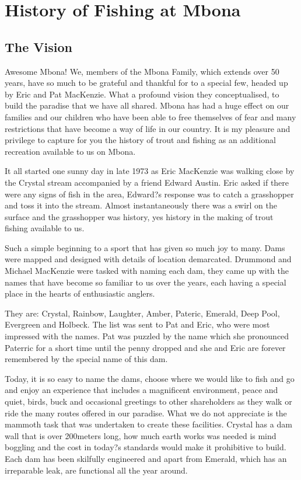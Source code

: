 
\chapter{History of Fishing at Mbona}

\section{The Vision}

Awesome Mbona! We, members of the Mbona Family, which extends over 50 years, 
have so much to be grateful and thankful for to a special few, headed up by Eric and Pat MacKenzie. 
What a profound vision they conceptualised, to build the paradise that we have all shared. 
Mbona has had a huge effect on our families and our children who have been able to free themselves 
of fear and many restrictions that have become a way of life in our country.
It is my pleasure and privilege to capture for you the history of trout and fishing as an additional recreation 
available to us on Mbona.

It all started one sunny day in late 1973 as Eric MacKenzie was walking close by the Crystal stream 
accompanied by a friend Edward Austin. Eric asked if there were any signs of fish in the area, 
Edward?s response was to catch a grasshopper and toss it into the stream. 
Almost instantaneously there was a swirl on the surface and the grasshopper was history, 
yes history in the making of trout fishing available to us. 

Such a simple beginning to a sport that has given so much joy to many.
Dams were mapped and designed with details of location demarcated. 
Drummond and Michael MacKenzie were tasked with naming each dam, 
they came up with the names that have become so familiar to us over the years, 
each having a special place in the hearts of enthusiastic anglers. 

They are:  Crystal, Rainbow, Laughter, Amber, Pateric, Emerald, Deep Pool, Evergreen and Holbeck. 
The list was sent to Pat and Eric, who were most impressed with the names. 
Pat was puzzled by the name which she pronounced Paterric for a short time until 
the penny dropped and she and Eric are forever remembered by the special name of this dam.

Today, it is so easy to name the dams, choose where we would like to fish and go 
and enjoy an experience that includes a magnificent environment, peace and quiet, birds, buck 
and occasional greetings to other shareholders as they walk or ride the many routes offered in our paradise. 
What we do not appreciate is the mammoth task that was undertaken to create these facilities. 
Crystal has a dam wall that is over 200meters long, how much earth works was needed is 
mind boggling and the cost in today?s standards would make it prohibitive to build. 
Each dam has been skilfully engineered and apart from Emerald, 
which has an irreparable leak, are functional all the year around.

